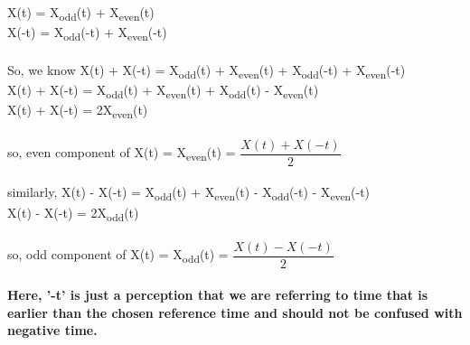 \documentclass{article}
\begin{document}
X(t) = X\textsubscript{odd}(t) + X\textsubscript{even}(t)\\
X(-t) = X\textsubscript{odd}(-t) + X\textsubscript{even}(-t)\\\\
So, we know X(t) + X(-t) = X\textsubscript{odd}(t) + X\textsubscript{even}(t) + X\textsubscript{odd}(-t) + X\textsubscript{even}(-t)\\
X(t) + X(-t) = X\textsubscript{odd}(t) + X\textsubscript{even}(t) + X\textsubscript{odd}(t) - X\textsubscript{even}(t)\\
X(t) + X(-t) = 2X\textsubscript{even}(t)\\\\
so, even component of X(t) = X\textsubscript{even}(t) = $\dfrac{X(t) + X(-t)}{2}$\\\\
similarly, X(t) - X(-t) = X\textsubscript{odd}(t) + X\textsubscript{even}(t) - X\textsubscript{odd}(-t) - X\textsubscript{even}(-t)\\
X(t) - X(-t) = 2X\textsubscript{odd}(t)\\\\
so, odd component of X(t) = X\textsubscript{odd}(t) = $\dfrac{X(t) - X(-t)}{2}$\\\\

\textbf{Here, '-t' is just a perception that we are referring to time that is earlier than the chosen reference time and should not be confused with negative time.}
\end{document}

